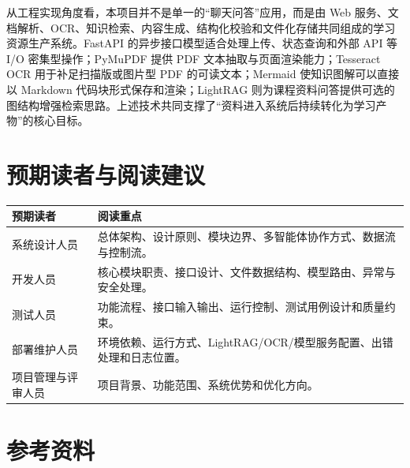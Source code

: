 \documentclass[UTF8,fontset=windows,zihao=-4,openany]{ctexrep}
\begin{document}
从工程实现角度看，本项目并不是单一的“聊天问答”应用，而是由 Web 服务、文档解析、OCR、知识检索、内容生成、结构化校验和文件化存储共同组成的学习资源生产系统。FastAPI 的异步接口模型适合处理上传、状态查询和外部 API 等 I/O 密集型操作；PyMuPDF 提供 PDF 文本抽取与页面渲染能力；Tesseract OCR 用于补足扫描版或图片型 PDF 的可读文本；Mermaid 使知识图解可以直接以 Markdown 代码块形式保存和渲染；LightRAG 则为课程资料问答提供可选的图结构增强检索思路。上述技术共同支撑了“资料进入系统后持续转化为学习产物”的核心目标。

\section{预期读者与阅读建议}

\begin{longtable}{p{}p{}}
\toprule
预期读者 & 阅读重点\\
\midrule
系统设计人员 & 总体架构、设计原则、模块边界、多智能体协作方式、数据流与控制流。\\
开发人员 & 核心模块职责、接口设计、文件数据结构、模型路由、异常与安全处理。\\
测试人员 & 功能流程、接口输入输出、运行控制、测试用例设计和质量约束。\\
部署维护人员 & 环境依赖、运行方式、LightRAG/OCR/模型服务配置、出错处理和日志位置。\\
项目管理与评审人员 & 项目背景、功能范围、系统优势和优化方向。\\
\bottomrule
\end{longtable}

\section{参考资料}
\end{document}
